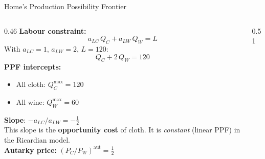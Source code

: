 \documentclass[aspectratio=169]{beamer}
\begin{document}
\begin{frame}[shrink=8]{Home's Production Possibility Frontier}
\begin{columns}[T]
\begin{column}{0.46\textwidth}
\textbf{Labour constraint:}
\[a_{LC}\,Q_C + a_{LW}\,Q_W = L\]
With $a_{LC}=1$, $a_{LW}=2$, $L=120$:
\[Q_C + 2\,Q_W = 120\]
\textbf{PPF intercepts:}
\begin{itemize}\small
  \item All cloth: $Q_C^{\max}=120$
  \item All wine: $Q_W^{\max}=60$
\end{itemize}
\textbf{Slope}: $-a_{LC}/a_{LW}=-\tfrac{1}{2}$\\[0.2em]
This slope is the \textbf{opportunity cost} of cloth.
It is \emph{constant} (linear PPF) in the Ricardian model.\\[0.3em]
\textbf{Autarky price:}
$(P_C/P_W)^{\text{aut}}=\tfrac{1}{2}$
\end{column}
\begin{column}{0.51\textwidth}
\end{column}
\end{columns}
\end{frame}
\end{document}

